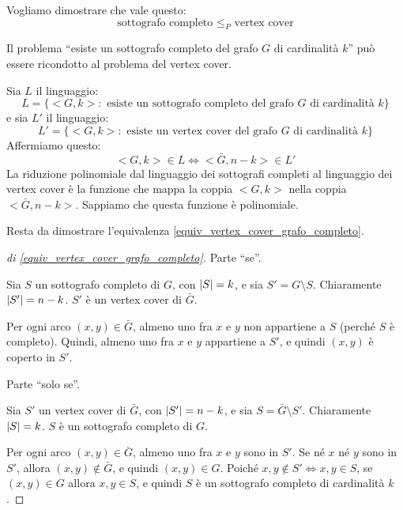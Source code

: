 Vogliamo dimostrare che vale questo:
\[
\text{sottografo completo } \le_P \text{ vertex cover}
\]

Il problema ``esiste un sottografo completo del grafo $G$ di cardinalit\`a $k$'' pu\`o essere ricondotto al problema del vertex cover.

Sia $L$ il linguaggio:
\[
L = \{ <G,k> : \text{ esiste un sottografo completo del grafo $G$ di cardinalit\`a $k$}\}
\]
e sia $L'$ il linguaggio:
\[
L' = \{ <G,k> : \text{ esiste un vertex cover del grafo $G$ di cardinalit\`a $k$}\}
\]
Affermiamo questo:
\begin{equation}
\label{equiv_vertex_cover_grafo_completo}
<G,k> \in L \iff <\bar{G}, n - k> \in L'
\end{equation}
La riduzione polinomiale dal linguaggio dei sottografi completi al linguaggio dei vertex cover \`e la funzione che mappa la coppia $<G,k>$ nella coppia $<\bar{G}, n - k>$. Sappiamo che questa funzione \`e polinomiale.

Resta da dimostrare l'equivalenza \ref{equiv_vertex_cover_grafo_completo}.

\begin{proof}[di \ref{equiv_vertex_cover_grafo_completo}]
Parte ``se''.

Sia $S$ un sottografo completo di $G$, con $\left\lvert{S}\right\rvert = k$, e sia $S' = G \setminus S$. Chiaramente $\left\lvert{S'}\right\rvert = n - k$. $S'$ \`e un vertex cover di $\bar{G}$.

Per ogni arco $(x,y) \in \bar{G}$, almeno uno fra $x$ e $y$ non appartiene a $S$ (perch\'e $S$ \`e completo). Quindi, almeno uno fra $x$ e $y$ appartiene a $S'$, e quindi $(x,y)$ \`e coperto in $S'$.

Parte ``solo se''.
 
Sia $S'$ un vertex cover di $\bar{G}$, con $\left\lvert{S'}\right\rvert = n - k$, e sia $S = \bar{G} \setminus S'$. Chiaramente $\left\lvert{S}\right\rvert = k$. $S$ \`e un sottografo completo di $G$.

Per ogni arco $(x,y) \in \bar{G}$, almeno uno fra $x$ e $y$ sono in $S'$. Se n\'e $x$ n\'e $y$ sono in $S'$, allora $(x,y) \notin \bar{G}$, e quindi $(x,y) \in G$. Poich\'e $x,y \notin S' \iff x,y \in S$, se $(x,y) \in G$ allora $x,y \in S$, e quindi $S$ \`e un sottografo completo di cardinalit\`a $k$.
\end{proof}

